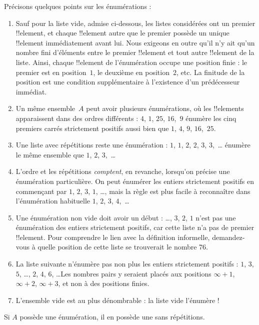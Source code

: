 \documentclass[../../../include/open-logic-section]{subfiles}
\begin{document}
\begin{explain}
Précisons quelques points sur les énumérations :
\begin{enumerate}
\item Sauf pour la liste vide, admise ci-dessous, les listes considérées
  ont un premier !!{element}, et chaque !!{element} autre que le premier
  possède un unique !!{element} immédiatement avant lui. Nous exigeons
  en outre qu’il n’y ait qu’un nombre fini d’éléments entre le premier
  !!{element} et tout autre !!{element} de la liste. Ainsi, chaque
  !!{element} de l’énumération occupe une position finie : le premier
  est en position~$1$, le deuxième en position~$2$, etc.
  La finitude de la position est une condition supplémentaire à
  l’existence d’un prédécesseur immédiat.
%
\item Un même ensemble~$A$ peut avoir plusieurs énumérations, où les
  !!{element}s apparaissent dans des ordres différents : $4$, $1$,
  $25$, $16$,~$9$ énumère les cinq premiers carrés strictement positifs
  aussi bien que $1$, $4$, $9$, $16$,~$25$.
\item Une liste avec répétitions reste une énumération : $1$, $1$, $2$,
  $2$, $3$, $3$,~\dots{} énumère le même ensemble que $1$, $2$,
  $3$,~\dots
\item L’ordre et les répétitions \emph{comptent}, en revanche, lorsqu’on
  précise une énumération particulière. On peut énumérer les entiers
  strictement positifs en commençant par $1$, $2$, $3$, $1$, \dots{},
  mais la règle est plus facile à reconnaître dans l’énumération
  habituelle $1$, $2$, $3$, $4$,~\dots
\item Une énumération non vide doit avoir un début : \dots, $3$, $2$,
  $1$ n’est pas une énumération des entiers strictement positifs, car
  cette liste n’a pas de premier !!{element}. Pour comprendre le lien
  avec la définition informelle, demandez-vous à quelle position
  de cette liste se trouverait le nombre 76.
\item La liste suivante n’énumère pas non plus les entiers strictement
  positifs : $1$, $3$, $5$, \dots, $2$, $4$, $6$, \dots\@ Les nombres
  pairs y seraient placés aux positions $\infty + 1$, $\infty + 2$,
  $\infty + 3$, et non à des positions finies.
\item L’ensemble vide est au plus dénombrable : la liste vide l’énumère !
\end{enumerate}
\end{explain}

\begin{prop}
Si $A$ possède une énumération, il en possède une sans répétitions.
\end{prop}
\end{document}
